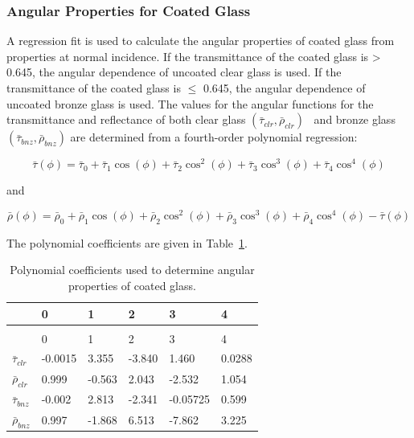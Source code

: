 \subsubsection{Angular Properties for Coated Glass}\label{angular-properties-for-coated-glass}

A regression fit is used to calculate the angular properties of coated glass from properties at normal incidence. If the transmittance of the coated glass is \textgreater{} 0.645, the angular dependence of uncoated clear glass is used. If the transmittance of the coated glass is \(\leq\) 0.645, the angular dependence of uncoated bronze glass is used. The values for the angular functions for the transmittance and reflectance of both clear glass \(({\bar \tau_{clr}},{\bar \rho_{clr}})\) ~and bronze glass \(({\bar \tau_{bnz}},{\bar \rho_{bnz}})\) are determined from a fourth-order polynomial regression:

\begin{equation}
\bar \tau (\phi ) = {\bar \tau_0} + {\bar \tau_1}\cos (\phi ) + {\bar \tau_2}{\cos ^2}(\phi ) + {\bar \tau_3}{\cos ^3}(\phi ) + {\bar \tau_4}{\cos ^4}(\phi )
\end{equation}

and

\begin{equation}
\bar \rho (\phi ) = {\bar \rho_0} + {\bar \rho_1}\cos (\phi ) + {\bar \rho_2}{\cos ^2}(\phi ) + {\bar \rho_3}{\cos ^3}(\phi ) + {\bar \rho_4}{\cos ^4}(\phi ) - \bar \tau (\phi )
\end{equation}

The polynomial coefficients are given in Table~\ref{table:polynomial-coefficients-used-to-determine}.

\begin{longtable}[c]{p{1.0in}p{1.0in}p{1.0in}p{1.0in}p{1.0in}p{1.0in}}

\caption{Polynomial coefficients used to determine angular properties of coated glass. \label{table:polynomial-coefficients-used-to-determine}} \tabularnewline
\toprule
~ & 0 & 1 & 2 & 3 & 4 \tabularnewline
\midrule
\endfirsthead

\caption[]{Polynomial coefficients used to determine angular properties of coated glass.} \tabularnewline
\toprule
~ & 0 & 1 & 2 & 3 & 4 \tabularnewline
\midrule
\endhead

$\bar{\tau}_{clr}$ & -0.0015 & 3.355 & -3.840 & 1.460 & 0.0288 \tabularnewline
$\bar{\rho}_{clr}$ & 0.999 & -0.563 & 2.043 & -2.532 & 1.054 \tabularnewline
$\bar{\tau}_{bnz}$ & -0.002 & 2.813 & -2.341 & -0.05725 & 0.599 \tabularnewline
$\bar{\rho}_{bnz}$ & 0.997 & -1.868 & 6.513 & -7.862 & 3.225 \tabularnewline
\bottomrule
\end{longtable}

